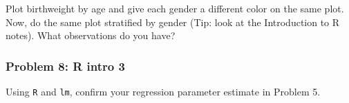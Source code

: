 \documentclass[]{article}
\begin{document}
Plot birthweight by age and give each gender a different color on the
same plot. Now, do the same plot stratified by gender (Tip: look at the
Introduction to R notes). What observations do you have?

\subsubsection{Problem 8: R intro 3}\label{problem-8-r-intro-3}

Using \texttt{R} and \texttt{lm}, confirm your regression parameter
estimate in Problem 5.
\end{document}
